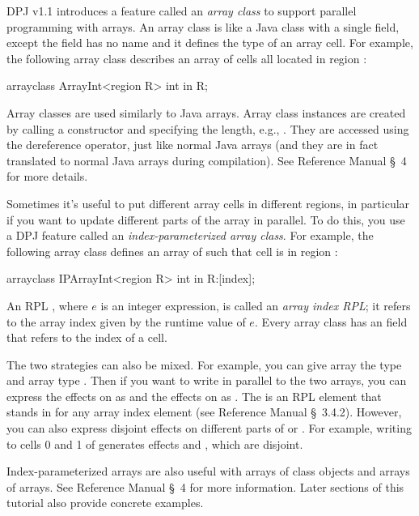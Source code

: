 DPJ v1.1 introduces a feature called an \emph{array class} to support
parallel programming with arrays.  An array class is like a Java class
with a single field, except the field has no name and it defines the
type of an array cell.  For example, the following array class
describes an array of  cells all located in region :
%
\begin{dpjlisting}
arrayclass ArrayInt<region R> {
    int in R;
}
\end{dpjlisting}
%
Array classes are used similarly to Java arrays.  Array class
instances are created by calling a constructor and specifying the
length, e.g., .  They are accessed using the
\kwd{[$\ldots$]} dereference operator, just like normal Java arrays
(and they are in fact translated to normal Java arrays during
compilation).  See Reference Manual \S~4 for more details.

Sometimes it's useful to put different array cells in different
regions, in particular if you want to update different parts of the
array in parallel.  To do this, you use a DPJ feature called an
\emph{index-parameterized array class}.  For example, the following
array class defines an array of  such that cell  is in
region \kwd{[i]}:
%
\begin{dpjlisting}
arrayclass IPArrayInt<region R> {
    int in R:[index];
}
\end{dpjlisting}
%
An RPL \kwd{[$e$]}, where $e$ is an integer expression, is called an
\emph{array index RPL}; it refers to the array index given by the
runtime value of $e$.  Every array class has an  field that
refers to the index of a cell.

The two strategies can also be mixed.  For example, you can give array
 the type  and array  type
.  Then if you want to write in parallel to the
two arrays, you can express the effects on  as   and the effects on  as .  The
\kwd{[?]} is an RPL element that stands in for any array index element
(see Reference Manual \S~3.4.2).  However, you can also express
disjoint effects on different parts of  or .  For
example, writing to cells 0 and 1 of  generates effects
 and , which are disjoint.

Index-parameterized arrays are also useful with arrays of class
objects and arrays of arrays.  See Reference Manual \S~4 for more
information.  Later sections of this tutorial also provide concrete
examples.

